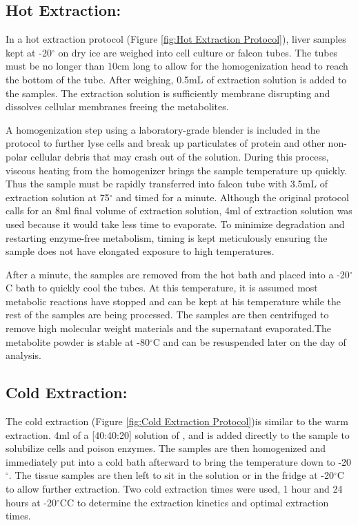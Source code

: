 \documentclass[a4paper,11pt,twoside]{book}
\begin{document}
	
	\subsection*{Hot Extraction:}
	
	In a hot extraction protocol (Figure \ref{fig:Hot Extraction Protocol}), liver samples kept at -20$^{\circ}$ on dry ice are weighed into cell culture or falcon tubes. The tubes must be no longer than 10cm long to allow for the homogenization head to reach the bottom of the tube. After weighing, 0.5mL of extraction solution is added to the samples. The extraction solution is sufficiently membrane disrupting and dissolves cellular membranes freeing the metabolites. 
	
	A homogenization step using a laboratory-grade blender is included in the protocol to further lyse cells and break up particulates of protein and other non-polar cellular debris that may crash out of the solution. During this process, viscous heating from the homogenizer brings the sample temperature up quickly. Thus the sample must be rapidly transferred into falcon tube with 3.5mL of extraction solution at 75$^{\circ}$ and timed for a minute. Although the original protocol calls for an 8ml final volume of extraction solution, 4ml of extraction solution was used because it would take less time to evaporate. To minimize degradation and restarting enzyme-free metabolism, timing is kept meticulously ensuring the sample does not have elongated exposure to high temperatures. 
	
	After a minute, the samples are removed from the hot bath and placed into a -20$^{\circ}$C bath to quickly cool the tubes. At this temperature, it is assumed most metabolic reactions have stopped and can be kept at his temperature while the rest of the samples are being processed. The samples are then centrifuged to remove high molecular weight materials and the supernatant evaporated.The metabolite powder is stable at -80$^\circ$C and can be resuspended later on the day of analysis.
	
	\subsection*{Cold Extraction:}
		
	The cold extraction (Figure \ref{fig:Cold Extraction Protocol})is similar to the warm extraction. 4ml of a [40:40:20] solution of ,  and  is added directly to the sample to solubilize cells and poison enzymes. The samples are then homogenized and immediately put into a cold bath afterward to bring the temperature down to -20$^\circ$. The tissue samples are then left to sit in the solution or in the fridge at -20$^{\circ}$C to allow further extraction. Two cold extraction times were used, 1 hour and 24 hours at -20$^{\circ}$CC to determine the extraction kinetics and optimal extraction times. 
		
\end{document}
